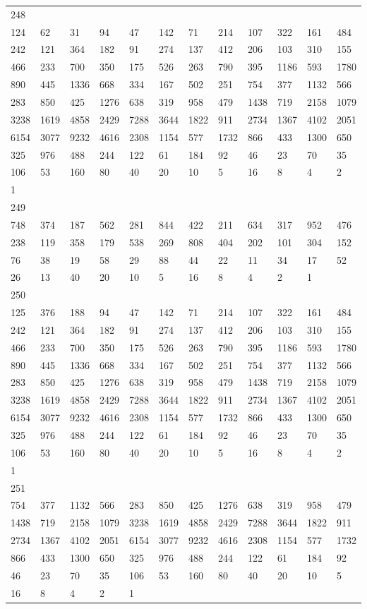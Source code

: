 \begin{longtable}{llllllllllll}
248&&&&&&&&&&&\\
124& 62& 31& 94& 47& 142& 71& 214& 107& 322& 161& 484\\
242& 121& 364& 182& 91& 274& 137& 412& 206& 103& 310& 155\\
466& 233& 700& 350& 175& 526& 263& 790& 395& 1186& 593& 1780\\
890& 445& 1336& 668& 334& 167& 502& 251& 754& 377& 1132& 566\\
283& 850& 425& 1276& 638& 319& 958& 479& 1438& 719& 2158& 1079\\
3238& 1619& 4858& 2429& 7288& 3644& 1822& 911& 2734& 1367& 4102& 2051\\
6154& 3077& 9232& 4616& 2308& 1154& 577& 1732& 866& 433& 1300& 650\\
325& 976& 488& 244& 122& 61& 184& 92& 46& 23& 70& 35\\
106& 53& 160& 80& 40& 20& 10& 5& 16& 8& 4& 2\\
1& \\

249&&&&&&&&&&&\\
748& 374& 187& 562& 281& 844& 422& 211& 634& 317& 952& 476\\
238& 119& 358& 179& 538& 269& 808& 404& 202& 101& 304& 152\\
76& 38& 19& 58& 29& 88& 44& 22& 11& 34& 17& 52\\
26& 13& 40& 20& 10& 5& 16& 8& 4& 2& 1& \\

250&&&&&&&&&&&\\
125& 376& 188& 94& 47& 142& 71& 214& 107& 322& 161& 484\\
242& 121& 364& 182& 91& 274& 137& 412& 206& 103& 310& 155\\
466& 233& 700& 350& 175& 526& 263& 790& 395& 1186& 593& 1780\\
890& 445& 1336& 668& 334& 167& 502& 251& 754& 377& 1132& 566\\
283& 850& 425& 1276& 638& 319& 958& 479& 1438& 719& 2158& 1079\\
3238& 1619& 4858& 2429& 7288& 3644& 1822& 911& 2734& 1367& 4102& 2051\\
6154& 3077& 9232& 4616& 2308& 1154& 577& 1732& 866& 433& 1300& 650\\
325& 976& 488& 244& 122& 61& 184& 92& 46& 23& 70& 35\\
106& 53& 160& 80& 40& 20& 10& 5& 16& 8& 4& 2\\
1& \\

251&&&&&&&&&&&\\
754& 377& 1132& 566& 283& 850& 425& 1276& 638& 319& 958& 479\\
1438& 719& 2158& 1079& 3238& 1619& 4858& 2429& 7288& 3644& 1822& 911\\
2734& 1367& 4102& 2051& 6154& 3077& 9232& 4616& 2308& 1154& 577& 1732\\
866& 433& 1300& 650& 325& 976& 488& 244& 122& 61& 184& 92\\
46& 23& 70& 35& 106& 53& 160& 80& 40& 20& 10& 5\\
16& 8& 4& 2& 1& \\


\end{longtable}
